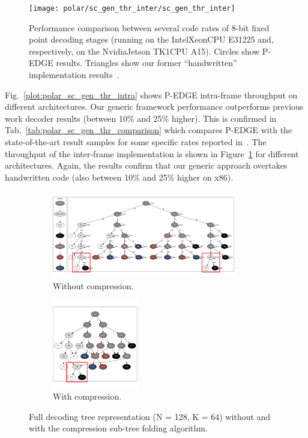 \begin{figure}
  \texttt{[image: polar/sc\_gen\_thr\_inter/sc\_gen\_thr\_inter]}
  \caption{Performance comparison between several code rates of 8-bit fixed
    point decoding stages (running on the Intel\R Xeon\R CPU E31225 and,
    respectively, on the Nvidia\R Jetson TK1\R CPU A15). Circles show P-EDGE
    results. Triangles show our former ``handwritten'' implementation
    results~\cite{LeGal2015a}.}
  \label{plot:polar_sc_gen_thr_inter}
\end{figure}

Fig.~\ref{plot:polar_sc_gen_thr_intra} shows P-EDGE intra-frame throughput on
different architectures. Our generic framework performance outperforms previous
work decoder results (between 10\% and 25\% higher). This is confirmed in
Tab.~\ref{tab:polar_sc_gen_thr_comparison} which compares P-EDGE with the
state-of-the-art result samples for some specific rates reported
in~\cite{Sarkis2014}. The throughput of the inter-frame implementation is shown
in Figure~\ref{plot:polar_sc_gen_thr_inter} for different architectures. Again,
the results confirm that our generic approach overtakes handwritten code (also
between 10\% and 25\% higher on x86).

\begin{figure}
  \centering
  \begin{subfigure}{8cm}
    \centering
    \includegraphics[width=8cm]{polar/sc_gen_compression/sc_gen_no_compression}
    \caption{Without compression.}
  \end{subfigure}
  \begin{subfigure}{4cm}
    \centering
    \includegraphics[width=3.725cm]{polar/sc_gen_compression/sc_gen_compression}
    \caption{With compression.}
  \end{subfigure}
  \caption{Full decoding tree representation (N = 128, K = 64) without and with
           the compression sub-tree folding algorithm.}
  \label{fig:polar_sc_gen_compression}
\end{figure}

